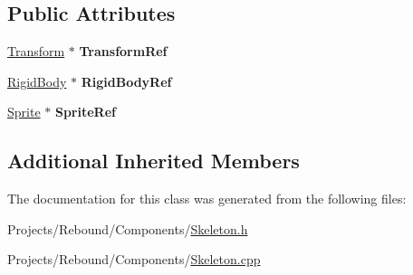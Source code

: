 \subsection*{Public Attributes}
\begin{DoxyCompactItemize}
\item 
\hypertarget{classDCEngine_1_1Components_1_1Skeleton_a8d9d0f0845dc3f5bd221b5a3a0a9411b}{\hyperlink{classDCEngine_1_1Components_1_1Transform}{Transform} $\ast$ {\bfseries Transform\-Ref}}\label{classDCEngine_1_1Components_1_1Skeleton_a8d9d0f0845dc3f5bd221b5a3a0a9411b}

\item 
\hypertarget{classDCEngine_1_1Components_1_1Skeleton_a38f4dc9c184d0111833b142c11664941}{\hyperlink{classDCEngine_1_1Components_1_1RigidBody}{Rigid\-Body} $\ast$ {\bfseries Rigid\-Body\-Ref}}\label{classDCEngine_1_1Components_1_1Skeleton_a38f4dc9c184d0111833b142c11664941}

\item 
\hypertarget{classDCEngine_1_1Components_1_1Skeleton_aef067ab9407bdfdcd2420ec31455b05f}{\hyperlink{classDCEngine_1_1Components_1_1Sprite}{Sprite} $\ast$ {\bfseries Sprite\-Ref}}\label{classDCEngine_1_1Components_1_1Skeleton_aef067ab9407bdfdcd2420ec31455b05f}

\end{DoxyCompactItemize}
\subsection*{Additional Inherited Members}


The documentation for this class was generated from the following files\-:\begin{DoxyCompactItemize}
\item 
Projects/\-Rebound/\-Components/\hyperlink{Skeleton_8h}{Skeleton.\-h}\item 
Projects/\-Rebound/\-Components/\hyperlink{Skeleton_8cpp}{Skeleton.\-cpp}\end{DoxyCompactItemize}
